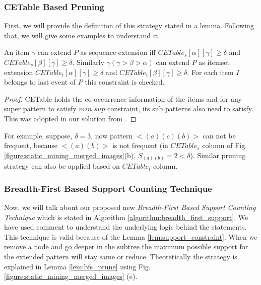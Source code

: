 \subsubsection{CETable Based Pruning}
First, we will provide the definition of this strategy stated in a lemma. Following that, we will give some examples to understand it.
\begin{lem} \label{lem:cetable}
   An item $\gamma$ can extend $P$ as sequence extension iff $CETable_{s}[\alpha][\gamma] \geq \delta$ and $CETable_{s}[\beta][\gamma] \geq \delta$. Similarly $\gamma(\gamma > \beta > \alpha)$ can extend $P$ as itemset extension  $CETable_{i}[\alpha][\gamma] \geq \delta$ and $CETable_{i}[\beta][\gamma] \geq \delta$. For each item $I$ belongs to last event of $P$ this constraint is checked. 
\end{lem}
\begin{proof}
    CETable holds the co-occurrence information of the items and for any super pattern to satisfy $min\_sup$ constraint, its sub patterns also need to satisfy. This was adopted in our solution from \cite{fournier2014fast}.
\end{proof}

For example, suppose, $\delta=3$, now pattern $< (a)(c)(b) >$ can not be frequent, because $<(a)(b) >$ is not frequent (in $CETable_{s}$ column of Fig. \ref{figure:static_mining_merged_images}(b), $S_{(a)(b)}=2 < \delta$). Similar pruning strategy can also be applied based on $CETable_{i}$ column.

\subsubsection{Breadth-First Based Support Counting Technique}

Now, we will talk about our proposed new \textit{Breadth-First Based Support Counting Technique} which is stated in Algorithm \ref{algorithm:breadth_first_support}. We have used comment to understand the underlying logic behind the statements. This technique is valid because of the Lemma \ref{lem:support_constraint}. When we remove a node and go deeper in the subtree the maximum possible support for the extended pattern will stay same or reduce. Theoretically the strategy is explained in Lemma \ref{lem:bfs_prune} using Fig. \ref{figure:static_mining_merged_images} (e).

